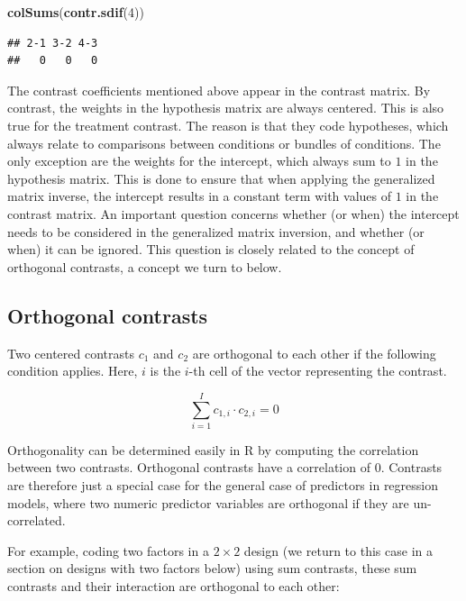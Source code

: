 \documentclass[12pt,]{krantz}
\newenvironment{Shaded}{\begin{snugshade}}{\end{snugshade}}
\newcommand{\DecValTok}[1]{\textcolor[rgb]{0.00,0.00,0.81}{#1}}
\newcommand{\KeywordTok}[1]{\textcolor[rgb]{0.13,0.29,0.53}{\textbf{#1}}}
\newcommand{\NormalTok}[1]{#1}
\theoremstyle{definition}
\theoremstyle{definition}
\theoremstyle{definition}
\theoremstyle{remark}
\begin{document}
\begin{Shaded}
\begin{Highlighting}[]
\KeywordTok{colSums}\NormalTok{(}\KeywordTok{contr.sdif}\NormalTok{(}\DecValTok{4}\NormalTok{))}
\end{Highlighting}
\end{Shaded}

\begin{verbatim}
## 2-1 3-2 4-3 
##   0   0   0
\end{verbatim}

The contrast coefficients mentioned above appear in the contrast matrix. By contrast, the weights in the hypothesis matrix are always centered. This is also true for the treatment contrast. The reason is that they code hypotheses, which always relate to comparisons between conditions or bundles of conditions.
The only exception are the weights for the intercept, which always sum to \(1\) in the hypothesis matrix. This is done to ensure that when applying the generalized matrix inverse, the intercept results in a constant term with values of \(1\) in the contrast matrix.
An important question concerns whether (or when) the intercept needs to be considered in the generalized matrix inversion, and whether (or when) it can be ignored. This question is closely related to the concept of orthogonal contrasts, a concept we turn to below.

\hypertarget{orthogonal-contrasts}{%
\subsection{Orthogonal contrasts}\label{orthogonal-contrasts}}

Two centered contrasts \(c_1\) and \(c_2\) are orthogonal to each other if the following condition applies. Here, \(i\) is the \(i\)-th cell of the vector representing the contrast.

\begin{equation}
\sum_{i=1}^I c_{1,i} \cdot c_{2,i} = 0
\end{equation}

Orthogonality can be determined easily in R by computing the correlation between two contrasts. Orthogonal contrasts have a correlation of \(0\). Contrasts are therefore just a special case for the general case of predictors in regression models, where two numeric predictor variables are orthogonal if they are un-correlated.

For example, coding two factors in a \(2 \times 2\) design (we return to this case in a section on designs with two factors below) using sum contrasts, these sum contrasts and their interaction are orthogonal to each other:
\end{document}
